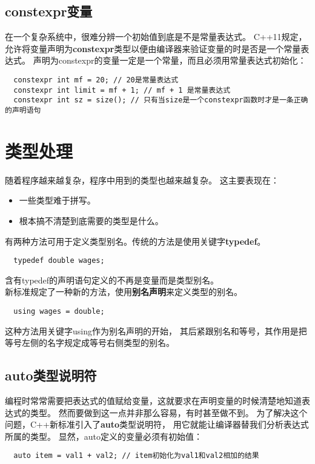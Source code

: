 \subsection{constexpr变量}
在一个复杂系统中，很难分辨一个初始值到底是不是常量表达式。%
C++11规定，允许将变量声明为{\bfseries{constexpr}}类型以便由编译器来验证变量的时是否是一个常量表达式。%
声明为constexpr的变量一定是一个常量，而且必须用常量表达式初始化：
\begin{lstlisting}
  constexpr int mf = 20; // 20是常量表达式
  constexpr int limit = mf + 1; // mf + 1 是常量表达式
  constexpr int sz = size(); // 只有当size是一个constexpr函数时才是一条正确的声明语句
\end{lstlisting}

\section{类型处理}
随着程序越来越复杂，程序中用到的类型也越来越复杂。%
这主要表现在：
\begin{itemize}
\item{一些类型难于拼写。}
\item{根本搞不清楚到底需要的类型是什么。}
\end{itemize}
有两种方法可用于定义类型别名。传统的方法是使用关键字{\bfseries{typedef}}。%
\begin{lstlisting}
  typedef double wages;
\end{lstlisting}
含有typedef的声明语句定义的不再是变量而是类型别名。\\
新标准规定了一种新的方法，使用{\bfseries{别名声明}}来定义类型的别名。
\begin{lstlisting}
  using wages = double;
\end{lstlisting}
这种方法用关键字using作为别名声明的开始，%
其后紧跟别名和等号，其作用是把等号左侧的名字规定成等号右侧类型的别名。%
\subsection{auto类型说明符}
编程时常常需要把表达式的值赋给变量，这就要求在声明变量的时候清楚地知道表达式的类型。%
然而要做到这一点并非那么容易，有时甚至做不到。%
为了解决这个问题，C++新标准引入了{\bfseries{auto}}类型说明符，%
用它就能让编译器替我们分析表达式所属的类型。%
显然，auto定义的变量必须有初始值：
\begin{lstlisting}
  auto item = val1 + val2; // item初始化为val1和val2相加的结果
\end{lstlisting}
